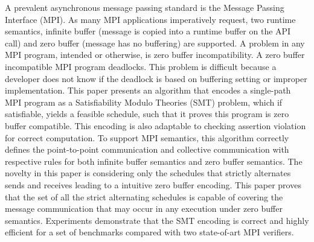 %
A prevalent asynchronous message passing standard is the Message Passing Interface (MPI). 
%
As many MPI applications imperatively request, two runtime semantics, infinite buffer (message is copied into a runtime buffer on the API call) and zero buffer (message has no buffering) are supported.
%
A problem in any MPI program, intended or otherwise, is zero buffer incompatibility. A zero buffer incompatible MPI program deadlocks.
%
This problem is difficult because a developer does not know if the deadlock is based on buffering setting or improper implementation. 
%
This paper presents an algorithm that encodes a single-path MPI program as a Satisfiability Modulo Theories (SMT) problem, which if satisfiable, yields a feasible schedule, such that it proves this program is zero buffer compatible. This encoding is also adaptable to checking assertion violation for correct computation.
%
To support MPI semantics, this algorithm correctly defines the point-to-point communication and collective communication with respective rules for both infinite buffer semantics and zero buffer semantics. 
%
The novelty in this paper is considering only the schedules that strictly alternates sends and receives leading to a intuitive zero buffer encoding.
%
This paper proves that the set of all the strict alternating schedules is capable of covering the message communication that may occur in any execution under zero buffer semantics. 
%
%
%
%
%
%
%
%
Experiments demonstrate that the SMT encoding is correct and highly efficient for a set of benchmarks compared with two state-of-art MPI verifiers. 
%
